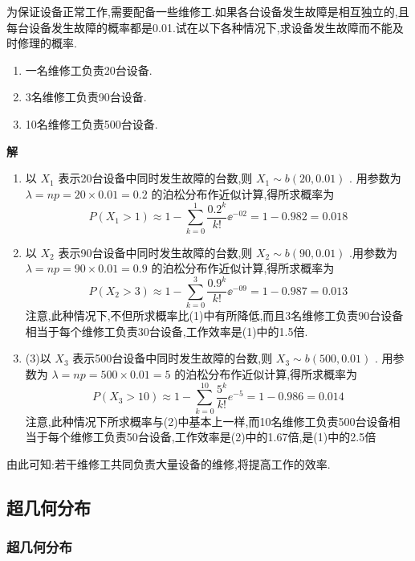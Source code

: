 \begin{example}
	为保证设备正常工作,需要配备一些维修工.如果各台设备发生故障是相互独立的,且每台设备发生故障的概率都是0.01.试在以下各种情况下,求设备发生故障而不能及时修理的概率.
	
	\begin{enumerate}
		\item 一名维修工负责20台设备.
		\item 3名维修工负责90台设备.
		\item 10名维修工负责500台设备.
	\end{enumerate}
	
	\textbf{解}
	\begin{enumerate}
		\item 以 $ X_{1} $ 表示20台设备中同时发生故障的台数,则 $ X_{1} \sim b(20,0.01) $ .
		用参数为 $ \lambda=n p=20 \times 0.01=0.2 $ 的泊松分布作近似计算,得所求概率为
		\[
		P\left(X_{1}>1\right) \approx 1-\sum_{k=0}^{1} \frac{0.2^{k}}{k !} \ee ^{-02}=1-0.982=0.018
		\]
		\item 以 $ X_{2} $ 表示90台设备中同时发生故障的台数,则 $ X_{2} \sim b(90,0.01) $ .用参数为 $ \lambda=n p=90 \times 0.01=0.9 $ 的泊松分布作近似计算,得所求概率为
		\[
		P\left(X_{2}>3\right) \approx 1-\sum_{k=0}^{3} \frac{0.9^{k}}{k !} \ee ^{-09}=1-0.987=0.013
		\]
		注意,此种情况下,不但所求概率比(1)中有所降低,而且3名维修工负责90台设备相当于每个维修工负责30台设备,工作效率是(1)中的1.5倍.
		\item 
		(3)以 $ X_{3} $ 表示500台设备中同时发生故障的台数,则 $ X_{3} \sim b(500,0.01) $ .
		用参数为 $ \lambda=n p=500 \times 0.01=5 $ 的泊松分布作近似计算,得所求概率为
		\[
		P\left(X_{3}>10\right) \approx 1-\sum_{k=0}^{10} \frac{5^{k}}{k !} e^{-5}=1-0.986=0.014
		\]
		注意,此种情况下所求概率与(2)中基本上一样,而10名维修工负责500台设备相当于每个维修工负责50台设备,工作效率是(2)中的1.67倍,是(1)中的2.5倍
	\end{enumerate}
	
	由此可知:若干维修工共同负责大量设备的维修,将提高工作的效率.
	
\end{example}

\subsection{超几何分布}\label{ssec:2.4.3}

\subsubsection{超几何分布}

